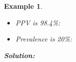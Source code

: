 \documentclass[12pt]{amsart}
\newtheorem{example}[theorem]{Example}
\begin{document}
{\begin{example}
\begin{itemize}
\vspace{1cm}
	\item PPV is 98.4\%: \newline 
	
\vspace{1cm}
	\item Prevalence is 20\%:\newline 

\end{itemize}

\vspace{0.5cm}
\textbf{Solution:} %
%
%
%
%

\end{example}
}  %
\end{document}
